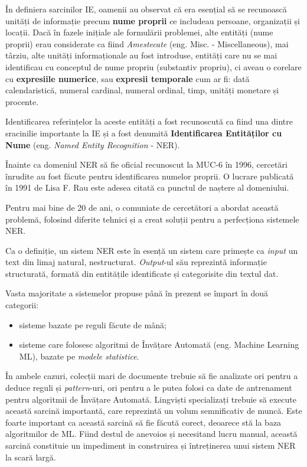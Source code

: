 În definiera sarcinilor IE, oamenii au observat că era esențial să se recunoască unități de informație precum \textbf{nume proprii} ce includeau persoane, organizații și locații. Dacă în fazele inițiale ale formulării problemei, alte entități (nume proprii) erau considerate ca fiind \textit{Amestecate} (eng. Misc. - Miscellaneous), mai târziu, alte unități informaționale au fost introduse, entități care nu se mai identificau cu conceptul de nume propriu (substantiv propriu), ci aveau o corelare cu \textbf{expresiile numerice}, sau \textbf{expresii temporale} cum ar fi: dată calendaristică, numeral cardinal, numeral ordinal, timp, unități monetare și procente.


Identificarea referințelor la aceste entități a fost recunoscută ca fiind una dintre sracinilie importante la IE și a fost denumită \textbf{Identificarea Entităților cu Nume} (eng. \textit{Named Entity Recognition} - NER).


Înainte ca domeniul NER să fie oficial recunoscut la MUC-6 în 1996, cercetări înrudite au fost făcute pentru identificarea numelor proprii. O lucrare publicată în 1991 de Lisa F. Rau este adesea citată ca punctul de naștere al domeniului.\cite{rau1991}

Pentru mai bine de 20 de ani, o comuniate de cercetători a abordat această problemă, folosind diferite tehnici și a creat soluții pentru a perfecționa sistemele NER.

Ca o definiție, un sistem NER este în esență un sistem care primește ca \textit{input} un text din limaj natural, nestructurat. \textit{Output}-ul său reprezintă informație structurată, formată din entitățile identificate și categorisite din textul dat.

Vasta majoritate a sistemelor propuse până în prezent se împart în două categorii:

\begin{itemize}
\item sisteme bazate pe reguli făcute de mână;
\item sisteme care folosesc algoritmi de Învățare Automată (eng. Machine Learning ML), bazate pe \textit{modele statistice}.
\end{itemize}


În ambele cazuri, colecții mari de documente trebuie să fie analizate ori pentru a deduce reguli și \textit{pattern}-uri, ori pentru a le putea folosi ca date  de antrenament pentru algoritmii de Învățare Automată. Lingviști specializați trebuie să execute această sarcină importantă, care reprezintă un volum semnificativ de muncă. Este foarte important ca această sarcină să fie făcută corect, deoarece stă la baza algoritmilor de ML. Fiind destul de anevoios și necesitand lucru manual, această sarcină constituie un impediment in construirea și întreținerea unui sistem NER la scară largă.

